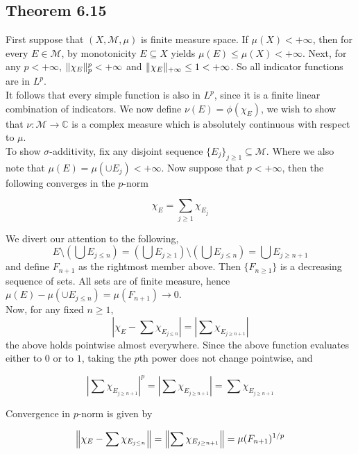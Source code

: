 \documentclass[../main.tex]{subfiles}
\begin{document}
\subsection{Theorem 6.15}
\begin{wts}
    
\end{wts}

First suppose that $(X,\mathcal{M}, \mu)$ is finite measure space. If $\mu(X)<+\infty$, then for every $E\in\mathcal{M}$, by monotonicity $E\subseteq X$ yields $\mu(E)\leq \mu(X)<+\infty$. Next, for any $p<+\infty$, $\lVert {\chi_E} \rVert ^p_p<+\infty$ and $\lVert {\chi_E} \rVert_{+\infty}\leq 1<+\infty$. So all indicator functions are in $L^p$.\\

It follows that every simple function is also in $L^p$, since it is a finite linear combination of indicators. We now define $\nu(E) = \phi(\chi_E)$, we wish to show that $\nu:\mathcal{M}\longrightarrow \mathbb{C}$ is a complex measure which is absolutely continuous with respect to $\mu$.\\

To show $\sigma$-additivity, fix any disjoint sequence $\{E_j\}_{j\geq 1}\subseteq \mathcal{M}$. Where we also note that $\mu(E) = \mu(\cup E_j) <+\infty$. Now suppose that $p<+\infty$, then the following converges in the $p$-norm

$$
\chi_E = \sum_{j\geq 1}\chi_{E_j}
$$

We divert our attention to the following,
$$
E\setminus\left(\bigcup E_{j\leq n}\right) = \left(\bigcup E_{j\geq 1}\right)\setminus \left(\bigcup E_{j\leq n}\right) = \bigcup E_{j\geq n+1}
$$
and define $F_{n+1}$ as the rightmost member above. Then $\{F_{n\geq 1}\}$ is a decreasing sequence of sets. All sets are of finite measure, hence $\mu(E) - \mu(\cup E_{j\leq n}) = \mu(F_{n+1})\to 0$.\\ 

Now, for any fixed $n\geq 1$, 
$$
\left|\chi_E - \sum \chi_{E_{j\leq n}}\right| = \left|\sum \chi_{E_{j\geq n+1}}\right| 
$$
the above holds pointwise almost everywhere. Since the above function evaluates either to $0$ or to $1$, taking the $p$th power does not change pointwise, and 

$$
\left|\sum \chi_{E_{j\geq n+1}}\right|^p = \left|\sum \chi_{E_{j\geq n+1}}\right| = \sum \chi_{E_{j\geq n+1}}
$$

Convergence in $p$-norm is given by

$$
\left\lVert {\chi_E - \sum \chi_{E_{j\leq n}}} \right\rVert = \left\lVert {\sum \chi_{E_{j\geq n+1}}} \right\rVert = \mu(F_{n+1})^{1/p}
$$
\end{document}
